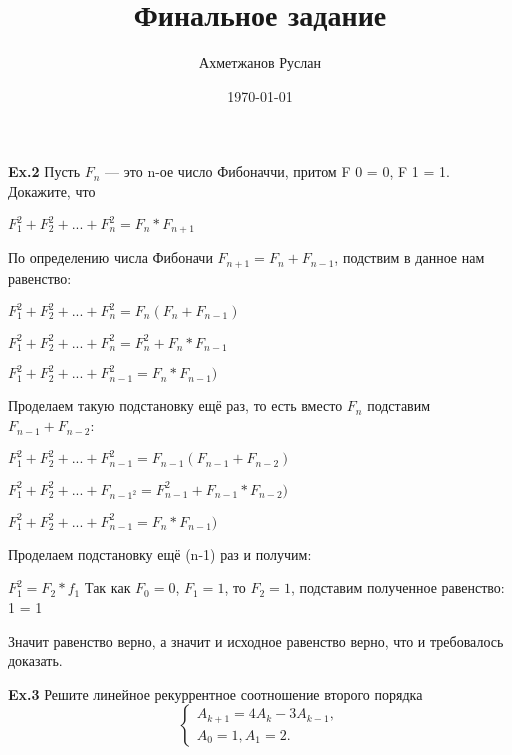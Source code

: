 \documentclass[a4paper,11pt]{article}
\author{Ахметжанов Руслан}
\title{Финальное задание}
\date{\today}
\begin{document}
\maketitle 

\textbf{Ex.2} Пусть $F_n$ — это n-ое число Фибоначчи, притом F 0 = 0, F 1 = 1. Докажите, что

 $F_1^2 + F_2^2 + ... + F_n^2 = F_n * F_{n+1}$
 
 \begin{center}
 По определению числа Фибоначи $F_{n+1} = F_n + F_{n-1}$, подствим в данное нам равенство:

  $F_1^2 + F_2^2 + ... + F_n^2 = F_n(F_n + F_{n-1})$
  
  $F_1^2 + F_2^2 + ... + F_n^2 =  F_n^2 + F_n * F_{n-1}$
  
  $F_1^2 + F_2^2 + ... + F_{n-1}^2 = F_n * F_{n-1})$
  
Проделаем такую подстановку ещё раз, то есть вместо $F_n$ подставим $F_{n-1} + F_{n-2} $:
  
   $F_1^2 + F_2^2 + ... + F_{n-1}^2 = F_{n-1}(F_{n-1} + F_{n-2})$
   
  $F_1^2 + F_2^2 + ... + F_{n-1^2} =  F_{n-1}^2 + F_{n-1} * F_{n-2})$
  
  $F_1^2 + F_2^2 + ... + F_{n-1}^2 = F_n * F_{n-1})$
 
Проделаем подстановку ещё (n-1) раз и получим:

$F_1^2 = F_2*f_1$
Так как $F_0 = 0$, $F_1=1$, то $F_2 = 1$, подставим полученное равенство:
1 = 1

Значит равенство верно, а значит и исходное равенство верно, что и требовалось доказать.
\end{center}


\textbf{Ex.3} Решите линейное рекуррентное соотношение второго порядка
\begin{equation*}
	 \begin{cases}
	 A_{k+1} = 4A_k-3A_{k-1},\\
	 A_0 = 1, A_1 = 2.
	 \end{cases}
\end{equation*}
\end{document}
